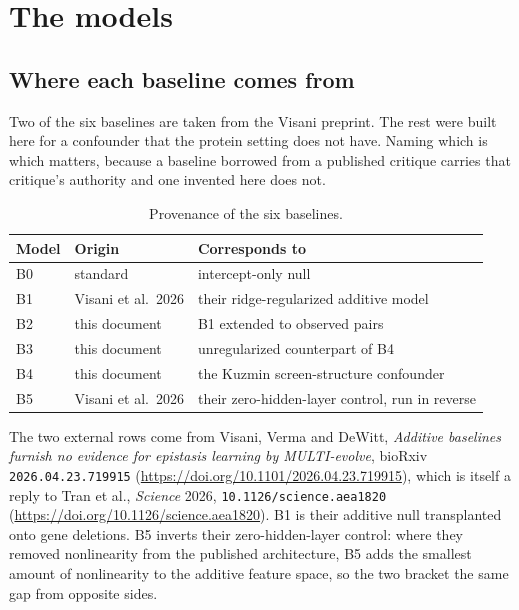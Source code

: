 
\section{The models}
\label{sec:models}

\subsection{Where each baseline comes from}
\label{sec:provenance}

Two of the six baselines are taken from the Visani preprint. The rest were built
here for a confounder that the protein setting does not have. Naming which is which matters, because a baseline borrowed from a published
critique carries that critique's authority and one invented here does not.

\begin{table}[htbp]
\centering
\begin{tabular}{lll}
\hline
Model & Origin & Corresponds to \\
\hline
B0 & standard & intercept-only null \\
B1 & Visani et al.\ 2026 & their ridge-regularized additive model \\
B2 & this document & B1 extended to observed pairs \\
B3 & this document & unregularized counterpart of B4 \\
B4 & this document & the Kuzmin screen-structure confounder \\
B5 & Visani et al.\ 2026 & their zero-hidden-layer control, run in reverse \\
\hline
\end{tabular}
\caption{Provenance of the six baselines.}
\label{tab:modelorigin}
\end{table}

The two external rows come from Visani, Verma and DeWitt, \emph{Additive
baselines furnish no evidence for epistasis learning by MULTI-evolve}, bioRxiv
\texttt{2026.04.23.719915}
(\url{https://doi.org/10.1101/2026.04.23.719915}), which is itself a reply to
Tran et al., \emph{Science} 2026, \texttt{10.1126/science.aea1820}
(\url{https://doi.org/10.1126/science.aea1820}). B1 is their additive null
transplanted onto gene deletions. B5 inverts their zero-hidden-layer control:
where they removed nonlinearity from the published architecture, B5 adds the
smallest amount of nonlinearity to the additive feature space, so the two
bracket the same gap from opposite sides.

